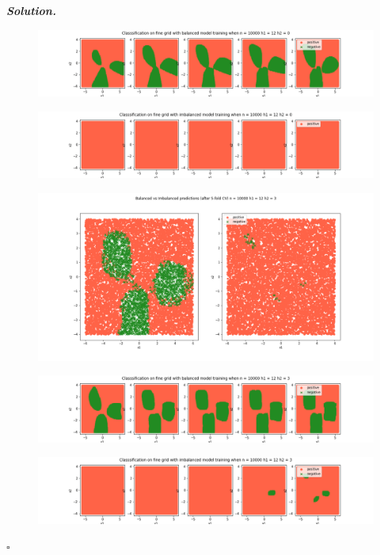 \documentclass[10pt]{article}
\newenvironment{solution}[1][\it{Solution}]{\textbf{#1. } }{$\square$}
\begin{document}
\begin{solution}
\begin{figure}[H]
\includegraphics[width=16cm, keepaspectratio]{./3/50}
\end{figure}
\begin{figure}[H]
\includegraphics[width=16cm, keepaspectratio]{./3/51}
\end{figure}
\begin{figure}[H]
\includegraphics[width=16cm, keepaspectratio]{./3/52}
\end{figure}
\begin{figure}[H]
\includegraphics[width=16cm, keepaspectratio]{./3/53}
\end{figure}
\begin{figure}[H]
\includegraphics[width=16cm, keepaspectratio]{./3/54}
\end{figure}


\end{solution}
\end{document}
